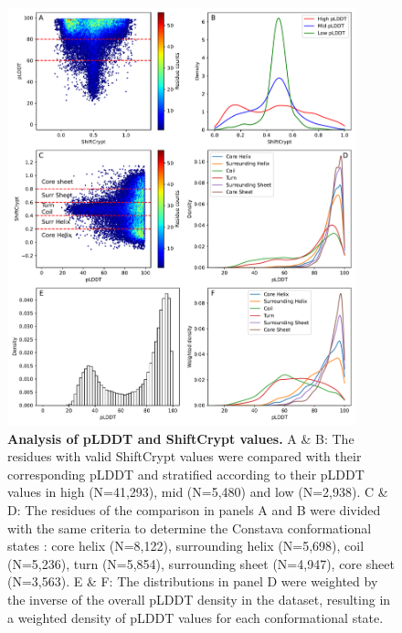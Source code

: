 \begin{figure}[H] 
    \centering
    \includegraphics[width=0.9\textwidth]{pLDDT/plddt_figures/plddt_vs_shiftCrypt_hexbin_density_undivided_constava_conf_classification.pdf}
    \caption{\textbf{Analysis of pLDDT and ShiftCrypt values.} 
    A \& B: The residues with valid ShiftCrypt values were compared with their corresponding pLDDT and stratified according to their pLDDT values in high (N=41,293), mid (N=5,480) and low (N=2,938). 
    C \& D: The residues of the comparison in panels A and B were divided with the same criteria to determine the Constava conformational states \cite{gavalda-garcia_data-driven_2024}: 
    core helix (N=8,122), surrounding helix (N=5,698), coil (N=5,236), turn (N=5,854), surrounding sheet (N=4,947), core sheet (N=3,563). 
    E \& F: %
    The distributions in panel D were weighted by the inverse of the overall pLDDT density in the dataset, resulting in a weighted density of pLDDT values for each conformational state. 
    }
    \label{fig:plddt_vs_shiftcrypt_undivided}
\end{figure}



